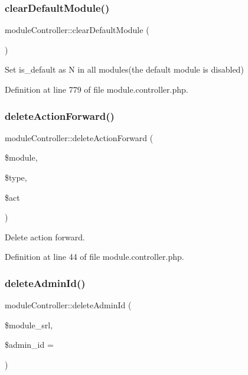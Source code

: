 \subsubsection{\texorpdfstring{clear\+Default\+Module()}{clearDefaultModule()}}
{\footnotesize\ttfamily module\+Controller\+::clear\+Default\+Module (\begin{DoxyParamCaption}{ }\end{DoxyParamCaption})}



Set is\+\_\+default as N in all modules(the default module is disabled) 



Definition at line 779 of file module.\+controller.\+php.

\hypertarget{classmoduleController_ad256622e3b12acb2d96997315dc6fc45}{}\label{classmoduleController_ad256622e3b12acb2d96997315dc6fc45} 
\subsubsection{\texorpdfstring{delete\+Action\+Forward()}{deleteActionForward()}}
{\footnotesize\ttfamily module\+Controller\+::delete\+Action\+Forward (\begin{DoxyParamCaption}\item[{}]{\$module,  }\item[{}]{\$type,  }\item[{}]{\$act }\end{DoxyParamCaption})}



Delete action forward. 



Definition at line 44 of file module.\+controller.\+php.

\hypertarget{classmoduleController_a1a9115a9e85acd2b26229e36ba29daf4}{}\label{classmoduleController_a1a9115a9e85acd2b26229e36ba29daf4} 
\subsubsection{\texorpdfstring{delete\+Admin\+Id()}{deleteAdminId()}}
{\footnotesize\ttfamily module\+Controller\+::delete\+Admin\+Id (\begin{DoxyParamCaption}\item[{}]{\$module\+\_\+srl,  }\item[{}]{\$admin\+\_\+id = {\ttfamily \textquotesingle{}\textquotesingle{}} }\end{DoxyParamCaption})}



